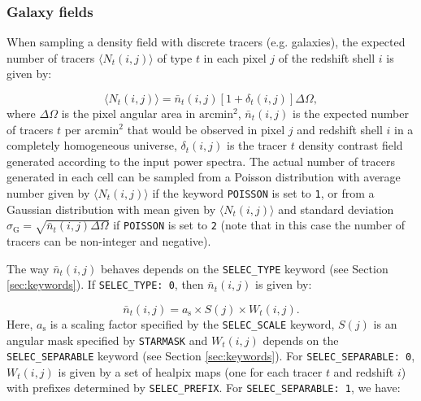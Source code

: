 \documentclass[12pt]{book} %
\begin{document}
\subsubsection{Galaxy fields}

When sampling a density field with discrete tracers (e.g. galaxies), the expected number 
of tracers $\langle N_t(i,j) \rangle$ of type $t$ in each pixel $j$ of the redshift shell $i$ 
is given by:

\begin{equation}
\langle N_t(i,j) \rangle = \bar{n}_t(i,j)[1+\delta_t(i,j)]\Delta\Omega,
\label{eq:tracer-number}
\end{equation}
where $\Delta\Omega$ is the pixel angular area in $\mathrm{arcmin}^2$, $\bar{n}_t(i,j)$ 
is the expected number of tracers $t$ per $\mathrm{arcmin}^2$ that would be observed 
in pixel $j$ and redshift shell $i$ in a completely homogeneous universe, 
$\delta_t(i,j)$ is the tracer $t$ density contrast field generated according 
to the input power spectra. The actual number of tracers generated in each cell can be sampled 
from a Poisson distribution with average number given by $\langle N_t(i,j) \rangle$ if the keyword 
{\tt POISSON} is set to {\tt 1}, or from a Gaussian distribution with mean given by 
$\langle N_t(i,j) \rangle$ and standard deviation $\sigma_{\mathrm{G}} = \sqrt{\bar{n}_t(i,j)\Delta\Omega}$ 
if {\tt POISSON} is set to {\tt 2} (note that in this case the number of tracers can be non-integer and 
negative).

The way $\bar{n}_t(i,j)$ behaves depends on the {\tt SELEC\_TYPE} keyword (see Section \ref{sec:keywords}). 
If {\tt SELEC\_TYPE: 0}, then $\bar{n}_t(i,j)$ is given by:

\begin{equation}
\bar{n}_t(i,j) = a_{\mathrm{s}} \times S(j) \times W_t(i,j).  
\label{eq:selection-function} 
\end{equation}
Here, $a_{\mathrm{s}}$ is a scaling factor specified by the {\tt SELEC\_SCALE} keyword, 
$S(j)$ is an angular mask specified by {\tt STARMASK} and $W_t(i,j)$ depends on the 
{\tt SELEC\_SEPARABLE} keyword (see Section \ref{sec:keywords}). For 
{\tt SELEC\_SEPARABLE: 0}, $W_t(i,j)$ is given by a set of {\sc healpix} maps (one for 
each tracer $t$ and redshift $i$) with prefixes determined by {\tt SELEC\_PREFIX}. For 
{\tt SELEC\_SEPARABLE: 1}, we have:
\end{document}
